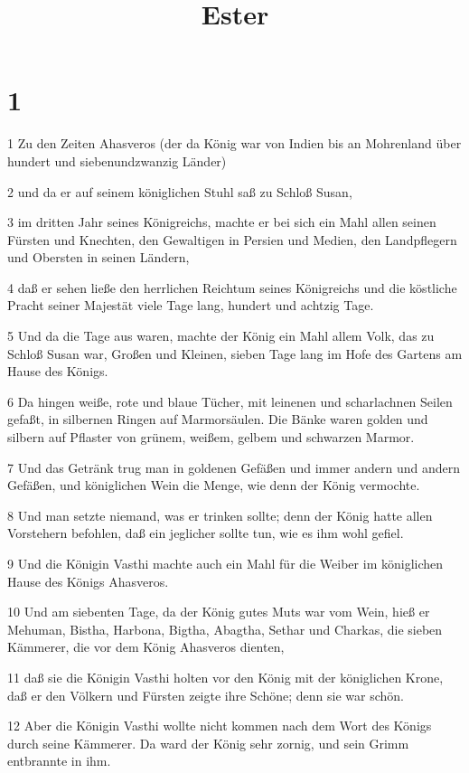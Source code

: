 

\title{Ester}


\chapter{1}

\par 1 Zu den Zeiten Ahasveros (der da König war von Indien bis an Mohrenland über hundert und siebenundzwanzig Länder)
\par 2 und da er auf seinem königlichen Stuhl saß zu Schloß Susan,
\par 3 im dritten Jahr seines Königreichs, machte er bei sich ein Mahl allen seinen Fürsten und Knechten, den Gewaltigen in Persien und Medien, den Landpflegern und Obersten in seinen Ländern,
\par 4 daß er sehen ließe den herrlichen Reichtum seines Königreichs und die köstliche Pracht seiner Majestät viele Tage lang, hundert und achtzig Tage.
\par 5 Und da die Tage aus waren, machte der König ein Mahl allem Volk, das zu Schloß Susan war, Großen und Kleinen, sieben Tage lang im Hofe des Gartens am Hause des Königs.
\par 6 Da hingen weiße, rote und blaue Tücher, mit leinenen und scharlachnen Seilen gefaßt, in silbernen Ringen auf Marmorsäulen. Die Bänke waren golden und silbern auf Pflaster von grünem, weißem, gelbem und schwarzen Marmor.
\par 7 Und das Getränk trug man in goldenen Gefäßen und immer andern und andern Gefäßen, und königlichen Wein die Menge, wie denn der König vermochte.
\par 8 Und man setzte niemand, was er trinken sollte; denn der König hatte allen Vorstehern befohlen, daß ein jeglicher sollte tun, wie es ihm wohl gefiel.
\par 9 Und die Königin Vasthi machte auch ein Mahl für die Weiber im königlichen Hause des Königs Ahasveros.
\par 10 Und am siebenten Tage, da der König gutes Muts war vom Wein, hieß er Mehuman, Bistha, Harbona, Bigtha, Abagtha, Sethar und Charkas, die sieben Kämmerer, die vor dem König Ahasveros dienten,
\par 11 daß sie die Königin Vasthi holten vor den König mit der königlichen Krone, daß er den Völkern und Fürsten zeigte ihre Schöne; denn sie war schön.
\par 12 Aber die Königin Vasthi wollte nicht kommen nach dem Wort des Königs durch seine Kämmerer. Da ward der König sehr zornig, und sein Grimm entbrannte in ihm.
